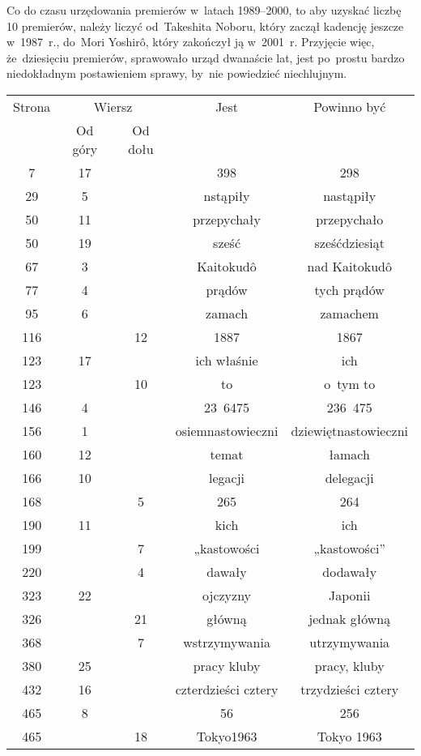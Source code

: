 \documentclass[a4paper,11pt]{article}
\numberwithin{equation}{section}
\begin{document}
Co do czasu urzędowania premierów w~latach 1989--2000, to aby uzyskać
liczbę 10 premierów, należy liczyć od~Takeshita Noboru, który zaczął
kadencję jeszcze w~1987~r., do~Mori Yoshir\^{o}, który zakończył ją
w~2001~r. Przyjęcie więc, że~dziesięciu premierów, sprawowało urząd
dwanaście lat, jest po~prostu bardzo niedokładnym postawieniem sprawy,
by~nie powiedzieć niechlujnym.




\newpage


\VerSpaceFour


\begin{center}

  \begin{tabular}{|c|c|c|c|c|}
    \hline
    Strona & \multicolumn{2}{c|}{Wiersz} & Jest
                              & Powinno być \\ \cline{2-3}
    & Od góry & Od dołu & & \\
    \hline
    7   & 17 & & 398 & 298 \\
    29  &  5 & & nstąpiły & nastąpiły \\
    50  & 11 & & przepychały & przepychało \\
    50  & 19 & & sześć & sześćdziesiąt \\
    67  &  3 & & Kaitokud\^{o} & nad Kaitokud\^{o} \\
    77  &  4 & & prądów & tych prądów \\
    95  &  6 & & zamach & zamachem \\
    116 & & 12 & 1887 & 1867 \\
    123 & 17 & & ich właśnie & ich \\
    123 & & 10 & to & o~tym to \\
    146 &  4 & & 23~6475 & 236~475 \\
    156 &  1 & & osiemnastowieczni & dziewiętnastowieczni \\
    160 & 12 & & temat & łamach \\
    166 & 10 & & legacji & delegacji \\
    168 & & 5 & 265 & 264 \\
    190 & 11 & & kich & ich \\
    199 & & 7 & „kastowości & „kastowości” \\
    220 & &  4 & dawały & dodawały \\
    323 & 22 & & ojczyzny & Japonii \\
    326 & & 21 & główną & jednak główną \\
    368 & &  7 & wstrzymywania & utrzymywania \\
    380 & 25 & & pracy kluby & pracy, kluby \\
    432 & 16 & & czterdzieści cztery & trzydzieści cztery \\
    465 &  8 & & 56 & 256 \\
    465 & & 18 & Tokyo1963 & Tokyo 1963 \\
    \hline
  \end{tabular}

\end{center}
\end{document}
